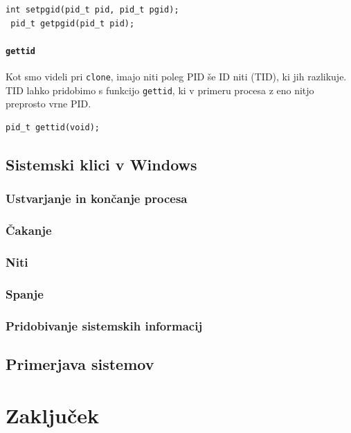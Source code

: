 \documentclass[a4paper,12pt,openright]{book}
\begin{document}
\begin{lstlisting}[style=func]
 int setpgid(pid_t pid, pid_t pgid);
 pid_t getpgid(pid_t pid);
\end{lstlisting}

\subsubsection{\texttt{gettid}}

Kot smo videli pri \texttt{clone}, imajo niti poleg PID še ID niti (TID), ki jih razlikuje.
TID lahko pridobimo s funkcijo \texttt{gettid}, ki v primeru procesa z eno nitjo preprosto vrne PID.

\begin{lstlisting}[style=func]
 pid_t gettid(void);
\end{lstlisting}

\section{Sistemski klici v Windows}

\subsection{Ustvarjanje in končanje procesa}

\subsection{Čakanje}

\subsection{Niti}

\subsection{Spanje}

\subsection{Pridobivanje sistemskih informacij}

\section{Primerjava sistemov}

\chapter{Zaključek}


\printbibliography[heading=bibintoc,title={Literatura}]
\end{document}

